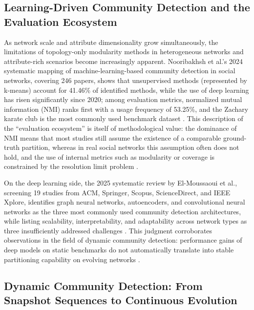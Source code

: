 \documentclass[12pt,a4paper]{article}
\begin{document}
\subsection{Learning-Driven Community Detection and the Evaluation Ecosystem}

As network scale and attribute dimensionality grow simultaneously, the limitations of topology-only modularity methods in heterogeneous networks and attribute-rich scenarios become increasingly apparent. Nooribakhsh et al.'s 2024 systematic mapping of machine-learning-based community detection in social networks, covering 246 papers, shows that unsupervised methods (represented by k-means) account for 41.46\% of identified methods, while the use of deep learning has risen significantly since 2020; among evaluation metrics, normalized mutual information (NMI) ranks first with a usage frequency of 53.25\%, and the Zachary karate club is the most commonly used benchmark dataset \cite{ref3}. This description of the ``evaluation ecosystem'' is itself of methodological value: the dominance of NMI means that most studies still assume the existence of a comparable ground-truth partition, whereas in real social networks this assumption often does not hold, and the use of internal metrics such as modularity or coverage is constrained by the resolution limit problem \cite{ref3}.

On the deep learning side, the 2025 systematic review by El-Moussaoui et al., screening 19 studies from ACM, Springer, Scopus, ScienceDirect, and IEEE Xplore, identifies graph neural networks, autoencoders, and convolutional neural networks as the three most commonly used community detection architectures, while listing scalability, interpretability, and adaptability across network types as three insufficiently addressed challenges \cite{ref4}. This judgment corroborates observations in the field of dynamic community detection: performance gains of deep models on static benchmarks do not automatically translate into stable partitioning capability on evolving networks \cite{ref5}.

\subsection{Dynamic Community Detection: From Snapshot Sequences to Continuous Evolution}
\end{document}
